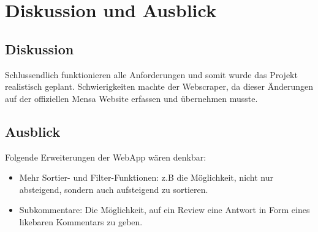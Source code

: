 \chapter{Diskussion und Ausblick}\label{chap:diskussion}

\section{Diskussion}\label{sub:diskussion}

Schlussendlich funktionieren alle Anforderungen und somit wurde das Projekt
realistisch geplant. Schwierigkeiten machte der Webscraper, da dieser Änderungen
auf der offiziellen Mensa Website erfassen und übernehmen musste.

\section{Ausblick}\label{sub:ausblick}

Folgende Erweiterungen der WebApp wären denkbar: 
\begin{itemize}
    \item Mehr Sortier- und Filter-Funktionen: z.B die Möglichkeit, nicht nur
    absteigend, sondern auch aufsteigend zu sortieren.
    \item Subkommentare: Die Möglichkeit, auf ein Review eine Antwort in Form
    eines likebaren Kommentars zu geben.
\end{itemize}




